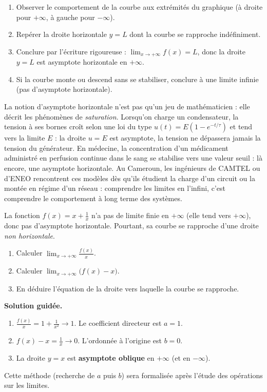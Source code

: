 \documentclass[11pt]{article}
\begin{document}
\begin{methode}
\begin{enumerate}
\item Observer le comportement de la courbe aux extrémités du graphique (à droite pour $+\infty$, à gauche pour $-\infty$).
\item Repérer la droite horizontale $y = L$ dont la courbe se rapproche indéfiniment.
\item Conclure par l'écriture rigoureuse : $\lim_{x \to +\infty} f(x) = L$, donc la droite $y = L$ est asymptote horizontale en $+\infty$.
\item Si la courbe monte ou descend sans se stabiliser, conclure à une limite infinie (pas d'asymptote horizontale).
\end{enumerate}
\end{methode}

\begin{savaistu}
La notion d'asymptote horizontale n'est pas qu'un jeu de mathématicien : elle décrit les phénomènes de \emph{saturation}. Lorsqu'on charge un condensateur, la tension à ses bornes croît selon une loi du type $u(t) = E\left(1 - e^{-t/\tau}\right)$ et tend vers la limite $E$ : la droite $u = E$ est asymptote, la tension ne dépassera jamais la tension du générateur. En médecine, la concentration d'un médicament administré en perfusion continue dans le sang se stabilise vers une valeur seuil : là encore, une asymptote horizontale. Au Cameroun, les ingénieurs de CAMTEL ou d'ENEO rencontrent ces modèles dès qu'ils étudient la charge d'un circuit ou la montée en régime d'un réseau : comprendre les limites en l'infini, c'est comprendre le comportement à long terme des systèmes.
\end{savaistu}

\begin{experience}
La fonction $f(x) = x + \frac{1}{x}$ n'a pas de limite finie en $+\infty$ (elle tend vers $+\infty$), donc pas d'asymptote horizontale. Pourtant, sa courbe se rapproche d'une droite \emph{non horizontale}.
\begin{enumerate}
\item Calculer $\lim_{x \to +\infty} \frac{f(x)}{x}$.
\item Calculer $\lim_{x \to +\infty} \bigl(f(x) - x\bigr)$.
\item En déduire l'équation de la droite vers laquelle la courbe se rapproche.
\end{enumerate}
\tcblower
\textbf{Solution guidée.}
\begin{enumerate}
\item $\frac{f(x)}{x} = 1 + \frac{1}{x^2} \to 1$. Le coefficient directeur est $a = 1$.
\item $f(x) - x = \frac{1}{x} \to 0$. L'ordonnée à l'origine est $b = 0$.
\item La droite $y = x$ est \textbf{asymptote oblique} en $+\infty$ (et en $-\infty$).
\end{enumerate}
Cette méthode (recherche de $a$ puis $b$) sera formalisée après l'étude des opérations sur les limites.
\end{experience}
\end{document}
